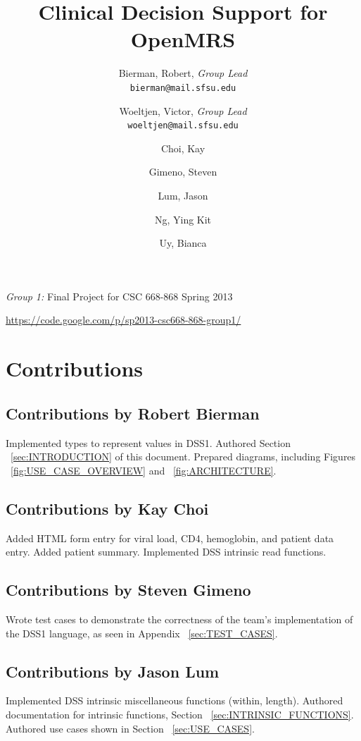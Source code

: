 \documentclass[12pt,letterpaper]{article}
\title{
  Clinical Decision Support for OpenMRS
}
\author{
        Bierman, Robert,  \emph{Group Lead}  \\ \texttt{bierman@mail.sfsu.edu} \and 
        Woeltjen, Victor, \emph{Group Lead}  \\ \texttt{woeltjen@mail.sfsu.edu} \and
        Choi, Kay       \and
        Gimeno, Steven  \and
        Lum, Jason      \and
        Ng, Ying Kit    \and
        Uy, Bianca      
}
\begin{document}
\newpage 

\maketitle
\begin{center}
\begin{Large}\emph{Group 1:} Final Project for CSC 668-868 Spring 2013\end{Large} \linebreak
\url{https://code.google.com/p/sp2013-csc668-868-group1/}
\end{center}
\thispagestyle{empty} %

\newpage {}
\tableofcontents


\newpage {}
\section{Contributions} 

\subsection{Contributions by Robert Bierman}
Implemented types to represent values in DSS1. Authored Section 
~\ref{sec:INTRODUCTION} of this document. Prepared diagrams, including 
Figures ~\ref{fig:USE_CASE_OVERVIEW} and ~\ref{fig:ARCHITECTURE}.

\subsection{Contributions by Kay Choi}
Added HTML form entry for viral load, CD4, hemoglobin, and 
patient data entry. Added patient summary. Implemented DSS intrinsic read 
functions.

\subsection{Contributions by Steven Gimeno}
Wrote test cases to demonstrate the correctness of the team's implementation 
of the DSS1 language, as seen in Appendix ~\ref{sec:TEST_CASES}.

\subsection{Contributions by Jason Lum}
Implemented DSS intrinsic miscellaneous functions (within, length). 
Authored documentation for intrinsic functions, Section ~\ref{sec:INTRINSIC_FUNCTIONS}. Authored use cases shown in Section ~\ref{sec:USE_CASES}.
\end{document}
